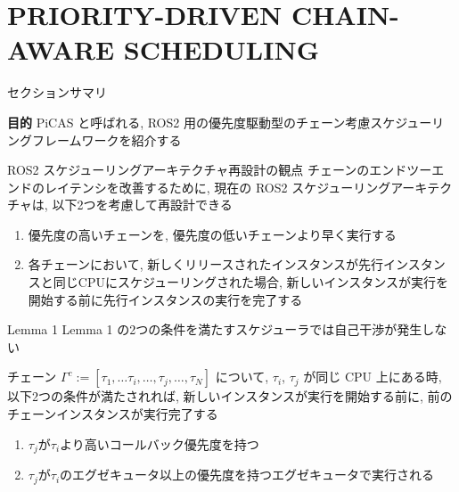 
\section{PRIORITY-DRIVEN CHAIN-AWARE SCHEDULING}
\label{sec: priority-driven chain-aware scheduling}

\begin{frame}{セクションサマリ}
    \begin{itembox}[l]{\textbf{目的}}
        PiCAS と呼ばれる, ROS2 用の優先度駆動型のチェーン考慮スケジューリングフレームワークを紹介する
    \end{itembox}
\end{frame}

\begin{frame}{ROS2 スケジューリングアーキテクチャ再設計の観点}
    チェーンのエンドツーエンドのレイテンシを改善するために, 現在の ROS2 スケジューリングアーキテクチャは, 以下2つを考慮して再設計できる
    \begin{enumerate}
        \item 優先度の高いチェーンを, 優先度の低いチェーンより早く実行する
        \item 各チェーンにおいて, 新しくリリースされたインスタンスが先行インスタンスと同じCPUにスケジューリングされた場合, 新しいインスタンスが実行を開始する前に先行インスタンスの実行を完了する
    \end{enumerate}
\end{frame}

\begin{frame}[label=lemma1]{Lemma 1}
    Lemma 1 の2つの条件を満たすスケジューラでは自己干渉が発生しない
    \begin{lemma}[]
        チェーン $\Gamma^{c}:=\left[\tau_{1}, \ldots \tau_{i}, \ldots, \tau_{j}, \ldots, \tau_{N}\right]$ について, $\tau_{i}$, $\tau_{j}$ が同じ CPU 上にある時, 以下2つの条件が満たされれば, 新しいインスタンスが実行を開始する前に, 前のチェーンインスタンスが実行完了する
        \begin{enumerate}
            \item $\tau_{j}$が$\tau_{i}$より高いコールバック優先度を持つ
            \item $\tau_{j}$が$\tau_{i}$のエグゼキュータ以上の優先度を持つエグゼキュータで実行される
        \end{enumerate}
    \end{lemma}
\end{frame}

